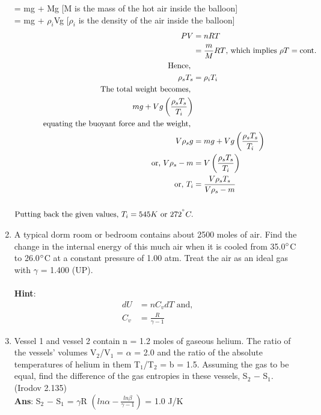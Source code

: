 \begin{enumerate}
= mg + Mg [M is the mass of the hot air inside the balloon]\\
= mg + $\rho _i$Vg [$\rho _i$ is the density of the air inside the balloon]\\
\begin{align*}
    PV &= nRT\\
    &=\frac{\displaystyle m}{\displaystyle M}RT \text{, which implies } \rho T = \text{cont.}\\
    \text{Hence, }\\
    \rho_s T_s &= \rho_i T_i\\
    \text{The total weight becomes, }\\
    mg + Vg\left(\frac{\rho_s T_s}{T_i}\right)\\
    \text{equating the buoyant force and the weight, }\\
    V\rho_sg &= mg + Vg\left(\frac{\rho_s T_s}{T_i}\right)\\
    \text{or, }V\rho_s - m &= V\left(\frac{\rho_s T_s}{T_i}\right)\\
    \text{or, }T_i &= \frac{V\rho_s T_s}{V\rho_s - m}\\\\
    \text{Putting back the given values, } T_i = 545K \text{ or }272^{\degree} C. 
\end{align*}

\item A typical dorm room or bedroom contains about 2500 moles of air. Find the change in the internal energy of this much air when it is cooled from 35.0$\degree$C to 26.0$\degree$C at a constant pressure of 1.00 atm. Treat the air as an ideal gas with $\gamma$ = 1.400 (UP). \\\\
\textbf{Hint}:\\
\begin{align*}
    dU &= nC_vdT \text{ and, }\\
    C_v &= \frac{R}{\gamma - 1}
\end{align*}

\item 	Vessel 1 and vessel 2 contain n = 1.2 moles of gaseous helium. The ratio of the vessels’ volumes V$_2$/V$_1$ = $\alpha$ = 2.0 and the ratio of the absolute temperatures of helium in them T$_1$/T$_2$ = b = 1.5. Assuming the gas to be equal, find the difference of the gas entropies in these vessels, S$_2$ $-$ S$_1$.  (Irodov  2.135)\\
\textbf{Ans}: S$_2$ $-$ S$_1$ = $\gamma$R $\left(ln\alpha -  \frac{ln\beta}{\gamma -1}\right)$ = 1.0 J/K


\end{enumerate}
